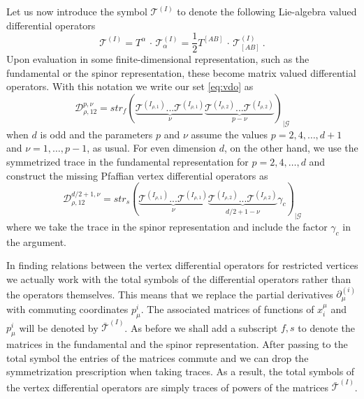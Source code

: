 \documentclass{article}
\def\cG{\mathcal{G}}
\begin{document}
Let us now introduce the symbol $\mathcal{T}^{(I)}$ to denote the 
following Lie-algebra valued differential operators 
$$ \mathcal{T}^{(I)} = T^\alpha \, \cdot \,  \mathcal{T}^{(I)}_\alpha = 
\frac 12 T^{[AB]} \, \cdot \, \mathcal{T}^{(I)}_{[AB]} \ . $$  
Upon evaluation in some finite-dimensional representation, such as the 
fundamental or the spinor representation, these become matrix valued 
differential operators. With this notation we write our set 
\eqref{eq:vdo} as 
\begin{equation}
    \mathcal{D}^{p,\nu}_{\rho,12}  =   
    \textit{str}_f\left(\underbrace{\mathcal{T}^{(I_{\rho,1})}...\mathcal{T}^{(I_{\rho,1})}}_{\nu}
    \underbrace{\mathcal{T}^{(I_{\rho,2})}...\mathcal{T}^{(I_{\rho,2})}}_{p-\nu}\right)_{|\cG} 
    \label{eq:vdoalt} 
\end{equation}
when $d$ is odd and the parameters $p$ and $\nu$ assume the values 
$p=2,4,\dots, d+1$ and $\nu = 1, \dots, p-1$, as usual. For even dimension 
$d$, on the other hand, we use the symmetrized trace in the fundamental 
representation for $p=2,4, \dots, d$ and construct the missing Pfaffian 
vertex differential operators as 
\begin{equation}
    \mathcal{D}^{d/2+1,\nu}_{\rho,12}  =   
    \textit{str}_s\left(\underbrace{\mathcal{T}^{(I_{\rho,1})}...\mathcal{T}^{(I_{\rho,1})}}_{\nu}\underbrace{
    \mathcal{T}^{(I_{\rho,2})}...\mathcal{T}^{(I_{\rho,2})}}_{d/2+1-\nu}\gamma_c\right)_{|\cG} 
    \label{eq:pdoalt} 
\end{equation}
where we take the trace in the spinor representation and include the factor 
$\gamma_c$ in the argument. 
\medskip  
 
In finding relations between the vertex differential operators for restricted 
vertices we actually work with the total symbols of the differential operators 
rather than the operators themselves. This means that we replace the partial 
derivatives $\partial^{(i)}_\mu$ with commuting coordinates $p^i_\mu$. The 
associated matrices of functions of $x_i^\mu$ and $p^i_\mu$ will be denoted by $\bar{\mathcal{T}}^{(I)}$. As before we shall add a subscript $f,s$ to denote 
the matrices in the fundamental and the spinor representation. After passing 
to the total symbol the entries of the matrices commute and we can drop the 
symmetrization prescription when taking traces. As a result, the total symbols of the 
vertex differential operators are simply traces of powers of the matrices 
$\bar{\mathcal{T}}^{(I)}$. 
\end{document}
